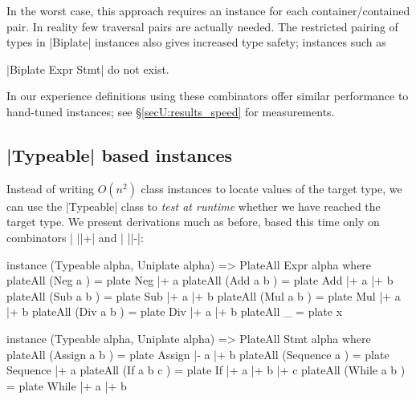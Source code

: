 In the worst case, this approach requires an instance for each container/contained pair. In reality few traversal pairs are actually needed. The restricted pairing of types in |Biplate| instances also gives increased type safety; instances such as \ignore|Biplate Expr Stmt| do not exist.

In our experience definitions using these combinators offer similar performance to hand-tuned instances; see \S\ref{secU:results_speed} for measurements.


\subsection{|Typeable| based instances}
\label{secU:implement_playtypeable}

Instead of writing $O(n^2)$ class instances to locate values of the target type, we can use the |Typeable| class to \textit{test at runtime} whether we have reached the target type. We present derivations much as before, based this time only on combinators | ||+| and | ||-|:

\begin{comment}
\begin{code}
type Type from to = ([to] -> [to], [to] -> (from,[to]))
uniplateAll :: PlateAll a b => a -> ([b],[b] -> a)
class PlateAll from to where
    plateAll :: from -> Type from to
plate :: from -> Type from to
(|+) :: (Typeable item, Typeable to, PlateAll item to) => Type (item -> from) to -> item -> Type from to
(|-) :: Type (item -> from) to -> item -> Type from to
instance (PlateAll from to, Typeable from, Typeable to, Uniplate to) => PlateAll [from] to where
\end{code}
\end{comment}

\begin{code}
instance (Typeable alpha, Uniplate alpha) => PlateAll Expr alpha where
    plateAll (Neg a    )  = plate Neg  |+ a
    plateAll (Add a b  )  = plate Add  |+ a |+ b
    plateAll (Sub a b  )  = plate Sub  |+ a |+ b
    plateAll (Mul a b  )  = plate Mul  |+ a |+ b
    plateAll (Div a b  )  = plate Div  |+ a |+ b
    plateAll _            = plate x

instance (Typeable alpha, Uniplate alpha) => PlateAll Stmt alpha where
    plateAll (Assign    a b    ) = plate Assign    |-  a |+ b
    plateAll (Sequence  a      ) = plate Sequence  |+  a
    plateAll (If        a b c  ) = plate If        |+  a |+ b |+ c
    plateAll (While     a b    ) = plate While     |+  a |+ b
\end{code}

